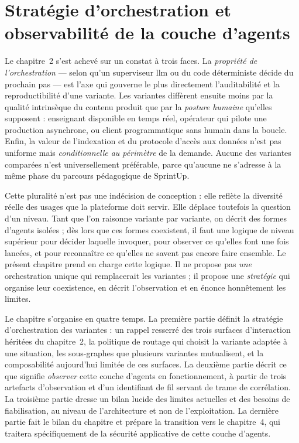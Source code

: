 \chapter{Stratégie d'orchestration et observabilité de la couche d'agents}
\label{chap:orchestration}

\sloppy

Le chapitre~2 s'est achevé sur un constat à trois faces. La
\emph{propriété de l'orchestration} — selon qu'un superviseur \gls{llm}
ou du code déterministe décide du prochain pas — est l'axe qui
gouverne le plus directement l'auditabilité et la reproductibilité
d'une variante. Les variantes diffèrent ensuite moins par la qualité
intrinsèque du contenu produit que par la \emph{posture humaine}
qu'elles supposent : enseignant disponible en temps réel, opérateur
qui pilote une production asynchrone, ou client programmatique sans
humain dans la boucle. Enfin, la valeur de l'indexation et du
protocole d'accès aux données n'est pas uniforme mais
\emph{conditionnelle au périmètre} de la demande. Aucune des variantes
comparées n'est universellement préférable, parce qu'aucune ne
s'adresse à la même phase du parcours pédagogique de SprintUp.

Cette pluralité n'est pas une indécision de conception : elle reflète
la diversité réelle des usages que la plateforme doit servir. Elle
déplace toutefois la question d'un niveau. Tant que l'on raisonne
variante par variante, on décrit des formes d'agents isolées ; dès
lors que ces formes coexistent, il faut une logique de niveau
supérieur pour décider laquelle invoquer, pour observer ce qu'elles
font une fois lancées, et pour reconnaître ce qu'elles ne savent pas
encore faire ensemble. Le présent chapitre prend en charge cette
logique. Il ne propose pas \emph{une} orchestration unique qui
remplacerait les variantes ; il propose une \emph{stratégie} qui
organise leur coexistence, en décrit l'observation et en énonce
honnêtement les limites.

Le chapitre s'organise en quatre temps. La première partie définit la
stratégie d'orchestration des variantes : un rappel resserré des trois
surfaces d'interaction héritées du chapitre~2, la politique de routage
qui choisit la variante adaptée à une situation, les sous-graphes que
plusieurs variantes mutualisent, et la composabilité aujourd'hui
limitée de ces surfaces. La deuxième partie décrit ce que signifie
\emph{observer} cette couche d'agents en fonctionnement, à partir de
trois artefacts d'observation et d'un identifiant de fil servant de
trame de corrélation. La troisième partie dresse un bilan lucide des
limites actuelles et des besoins de fiabilisation, au niveau de
l'architecture et non de l'exploitation. La dernière partie fait le
bilan du chapitre et prépare la transition vers le chapitre~4, qui
traitera spécifiquement de la sécurité applicative de cette couche
d'agents.

